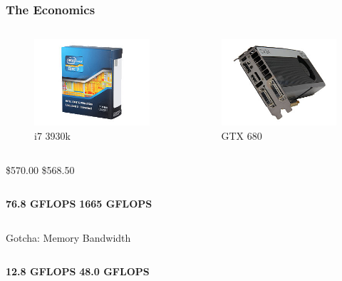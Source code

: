 \documentclass[12pt]{beamer}
\begin{document}
\begin{frame}
\frametitle{The Economics}
\begin{columns}
\begin{figure}
\includegraphics[width=.75\textwidth]{img/i73930k.png}
\caption{i7 3930k}
\end{figure}
\begin{figure}
\includegraphics[width=.75\textwidth]{img/gtx680.png}
\caption{GTX 680}
\end{figure}
\end{columns}
\pause
\begin{columns}
\centering
\$570.00
\centering
\$568.50
\end{columns}
\pause
\begin{columns}
\centering
\textbf{76.8 GFLOPS}
\centering
\textbf{1665 GFLOPS}
\end{columns}
\pause
\begin{alertblock}{Gotcha: Memory Bandwidth}
\begin{columns}
\centering
\textbf{12.8 GFLOPS}
\centering
\textbf{48.0 GFLOPS}
\end{columns}
\end{alertblock}
\end{frame}
\end{document}
